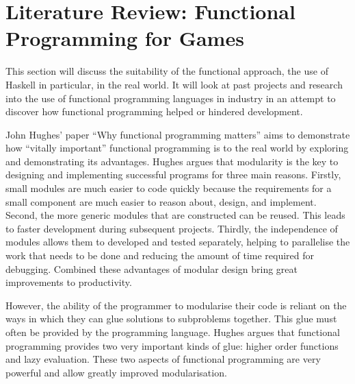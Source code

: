 \section{Literature Review: Functional Programming for Games}
\label{sec:fp_review}

\label{cf:code_organisation} %


This section will discuss the suitability of the functional approach, the use
of Haskell in particular, in the real world. It will look at past projects and
research into the use of functional programming languages in industry in an
attempt to discover how functional programming helped or hindered development.

John Hughes' paper ``Why functional programming matters'' aims to demonstrate how
``vitally important'' functional programming is to the real world by exploring and
demonstrating its advantages.\cite{hughes1989functional} Hughes argues that modularity
is the key to designing and implementing successful programs for three main reasons.
Firstly, small modules are much easier to code quickly because the requirements for
a small component are much easier to reason about, design, and implement. Second,
the more generic modules that are constructed can be reused. This leads to faster
development during subsequent projects. Thirdly, the independence of modules allows
them to developed and tested separately, helping to parallelise the work that needs
to be done and reducing the amount of time required for debugging. Combined these
advantages of modular design bring great improvements to productivity.

However, the ability of the programmer to modularise their code is reliant on the
ways in which they can glue solutions to subproblems together. This glue must
often be provided by the programming language. Hughes argues that functional
programming provides two very important kinds of glue: higher order functions
and lazy evaluation. These two aspects of functional programming are very powerful
and allow greatly improved modularisation.

